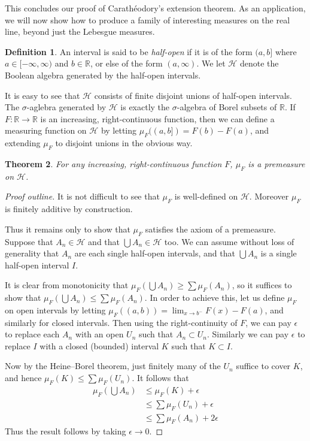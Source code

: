 \documentclass[11pt,oneside]{amsbook}
\newcommand{\RR}{{\mathbb R}}
\theoremstyle{definition}
\theoremstyle{plain}
\newtheorem{thm}{Theorem}[section]
\theoremstyle{definition}
\newtheorem{defn}[thm]{Definition}
\theoremstyle{remark}
\numberwithin{equation}{section}
\numberwithin{figure}{section}
\begin{document}
This concludes our proof of Carath\'eodory's extension theorem. As an application, we will now show how to produce a family of interesting measures on the real line, beyond just the Lebesgue measures.

\begin{defn}
  An interval is said to be \emph{half-open} if it is of the form $(a,b]$ where $a\in[-\infty,\infty)$ and $b\in\RR$, or else of the form $(a,\infty)$. We let $\mathcal H$ denote the Boolean algebra generated by the half-open intervals.
\end{defn}

It is easy to see that $\mathcal H$ consists of finite disjoint unions of half-open intervals. The $\sigma$-aglebra generated by $\mathcal H$ is exactly the $\sigma$-algebra of Borel subsets of $\RR$. If $F\colon\RR\to\RR$ is an increasing, right-continuous function, then we can define a measuring function on $\mathcal H$ by letting $\mu_F((a,b])=F(b)-F(a)$, and extending $\mu_F$ to disjoint unions in the obvious way.

\begin{thm}
  For any increasing, right-continuous function $F$, $\mu_F$ is a premeasure on $\mathcal H$.
\end{thm}

\begin{proof}[Proof outline]
  It is not difficult to see that $\mu_F$ is well-defined on $\mathcal H$. Moreover $\mu_F$ is finitely additive by construction.

  Thus it remains only to show that $\mu_F$ satisfies the axiom of a premeasure. Suppose that $A_n\in\mathcal H$ and that $\bigcup A_n\in\mathcal H$ too. We can assume without loss of generality that $A_n$ are each single half-open intervals, and that $\bigcup A_n$ is a single half-open interval $I$.

  It is clear from monotonicity that $\mu_F(\bigcup A_n)\geq\sum\mu_F(A_n)$, so it suffices to show that $\mu_F(\bigcup A_n)\leq\sum\mu_F(A_n)$. In order to achieve this, let us define $\mu_F$ on open intervals by letting $\mu_F((a,b))=\lim_{x\to b^-}F(x)-F(a)$, and similarly for closed intervals. Then using the right-continuity of $F$, we can pay $\epsilon$ to replace each $A_n$ with an open $U_n$ such that $A_n\subset U_n$. Similarly we can pay $\epsilon$ to replace $I$ with a closed (bounded) interval $K$ such that $K\subset I$.

  Now by the Heine--Borel theorem, just finitely many of the $U_n$ suffice to cover $K$, and hence $\mu_F(K)\leq\sum\mu_F(U_n)$. It follows that
  \begin{align*}
    \mu_F(\bigcup A_n)
    &\leq\mu_F(K)+\epsilon\\
    &\leq\sum\mu_F(U_n)+\epsilon\\
    &\leq\sum\mu_F(A_n)+2\epsilon
  \end{align*}  
  Thus the result follows by taking $\epsilon\to0$.
\end{proof}
\end{document}
